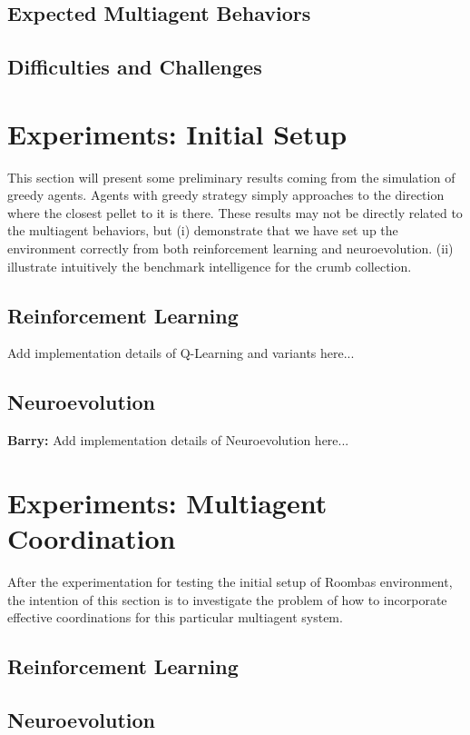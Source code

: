 \documentclass[conference]{IEEEtran}
\begin{document}
\subsection{Expected Multiagent Behaviors}

\subsection{Difficulties and Challenges}

\section{Experiments: Initial Setup}
This section will present some preliminary results coming from the simulation
of greedy agents. Agents with greedy strategy simply approaches to the direction
where the closest pellet to it is there.  These results may not be directly
related to the multiagent behaviors, but 
(i) demonstrate that we have set up the environment correctly from both
reinforcement learning and neuroevolution. 
(ii) illustrate intuitively the benchmark intelligence for the crumb
collection.

\subsection{Reinforcement Learning}
Add implementation details of Q-Learning and variants here...

\subsection{Neuroevolution}
\textbf{Barry:}
Add implementation details of Neuroevolution here...

\section{Experiments: Multiagent Coordination}
After the experimentation for testing the initial setup of Roombas
environment, the intention of this section is to investigate the problem of
how to incorporate effective coordinations for this particular multiagent
system.
\subsection{Reinforcement Learning}

\subsection{Neuroevolution}
\end{document}
